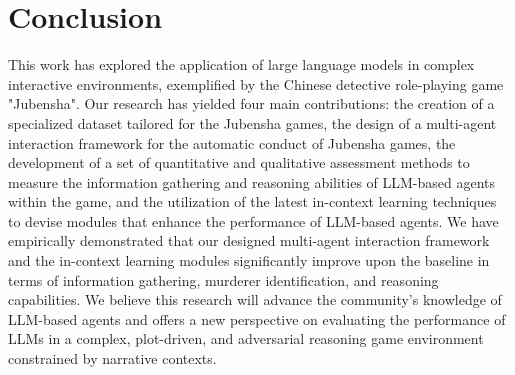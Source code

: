 \documentclass[11pt]{article}
\begin{document}








\section{Conclusion}

This work has explored the application of large language models in complex interactive environments, exemplified by the Chinese detective role-playing game "Jubensha". Our research has yielded four main contributions: the creation of a specialized dataset tailored for the Jubensha games, the design of a multi-agent interaction framework for the automatic conduct of Jubensha games, the development of a set of quantitative and qualitative assessment methods to measure the information gathering and reasoning abilities of LLM-based agents within the game, and the utilization of the latest in-context learning techniques to devise modules that enhance the performance of LLM-based agents. We have empirically demonstrated that our designed multi-agent interaction framework and the in-context learning modules significantly improve upon the baseline in terms of information gathering, murderer identification, and reasoning capabilities. We believe this research will advance the community's knowledge of LLM-based agents and offers a new perspective on evaluating the performance of LLMs in a complex, plot-driven, and adversarial reasoning game environment constrained by narrative contexts.
\end{document}

